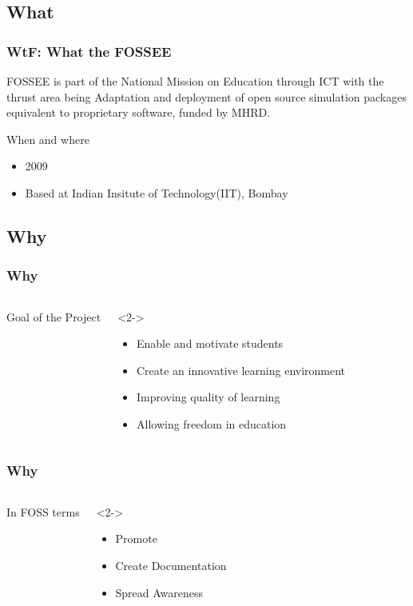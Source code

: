 \documentclass[compress,red]{beamer} %
\begin{document}
\subsection{What}
\begin{frame}
\frametitle{WtF: What the FOSSEE}
\begin{block}{FOSSEE}
is  part of the National Mission on Education through ICT with the thrust area being \alert{Adaptation and deployment of open source simulation packages equivalent to proprietary software}, funded by MHRD.
\end{block}
\begin{block}{When and where}
\begin{itemize}
\item 2009
\item Based at Indian Insitute of Technology(IIT), Bombay 
\end{itemize}
\end{block}
\end{frame}

\subsection{Why}
\begin{frame}
\frametitle{Why}
\begin{columns}
\begin{exampleblock}{}
Goal of the Project
\end{exampleblock}
\begin{exampleblock}<2->{}
\begin{itemize}
\item Enable and motivate students
\item Create an innovative learning environment
\item Improving quality of learning
\item Allowing freedom in education
\end{itemize}
\end{exampleblock}
\end{columns}
\end{frame}

\begin{frame}
\frametitle{Why}
\begin{columns}
\begin{exampleblock}{}
In FOSS terms
\end{exampleblock}
\begin{exampleblock}<2->{}
\begin{itemize}
\item Promote 
\item Create Documentation
\item Spread Awareness
\end{itemize}
\end{exampleblock}
\end{columns}
\end{frame}
\end{document}
